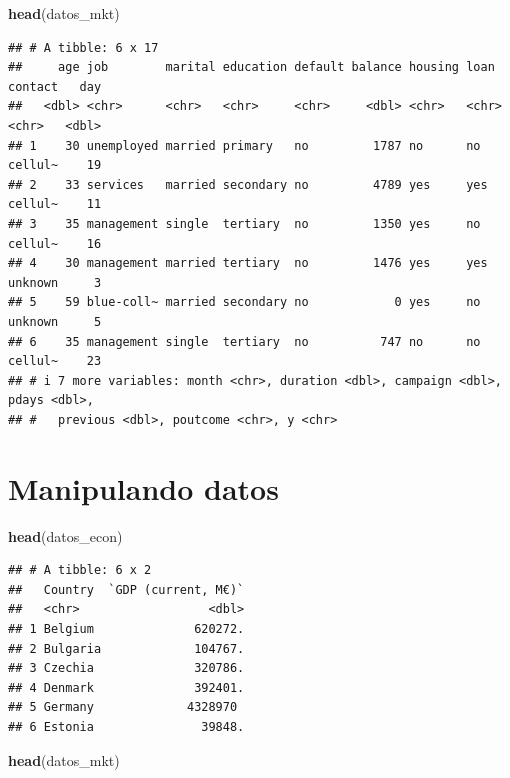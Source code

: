 \documentclass[
]{book}
\newenvironment{Shaded}{\begin{snugshade}}{\end{snugshade}}
\newcommand{\FunctionTok}[1]{\textcolor[rgb]{0.13,0.29,0.53}{\textbf{#1}}}
\newcommand{\NormalTok}[1]{#1}
\begin{document}
\begin{Shaded}
\begin{Highlighting}[]
\FunctionTok{head}\NormalTok{(datos\_mkt)}
\end{Highlighting}
\end{Shaded}

\begin{verbatim}
## # A tibble: 6 x 17
##     age job        marital education default balance housing loan  contact   day
##   <dbl> <chr>      <chr>   <chr>     <chr>     <dbl> <chr>   <chr> <chr>   <dbl>
## 1    30 unemployed married primary   no         1787 no      no    cellul~    19
## 2    33 services   married secondary no         4789 yes     yes   cellul~    11
## 3    35 management single  tertiary  no         1350 yes     no    cellul~    16
## 4    30 management married tertiary  no         1476 yes     yes   unknown     3
## 5    59 blue-coll~ married secondary no            0 yes     no    unknown     5
## 6    35 management single  tertiary  no          747 no      no    cellul~    23
## # i 7 more variables: month <chr>, duration <dbl>, campaign <dbl>, pdays <dbl>,
## #   previous <dbl>, poutcome <chr>, y <chr>
\end{verbatim}

\chapter{Manipulando datos}\label{manipulando_datos}

\begin{Shaded}
\begin{Highlighting}[]
\FunctionTok{head}\NormalTok{(datos\_econ)}
\end{Highlighting}
\end{Shaded}

\begin{verbatim}
## # A tibble: 6 x 2
##   Country  `GDP (current, M€)`
##   <chr>                  <dbl>
## 1 Belgium              620272.
## 2 Bulgaria             104767.
## 3 Czechia              320786.
## 4 Denmark              392401.
## 5 Germany             4328970 
## 6 Estonia               39848.
\end{verbatim}

\begin{Shaded}
\begin{Highlighting}[]
\FunctionTok{head}\NormalTok{(datos\_mkt)}
\end{Highlighting}
\end{Shaded}
\end{document}
